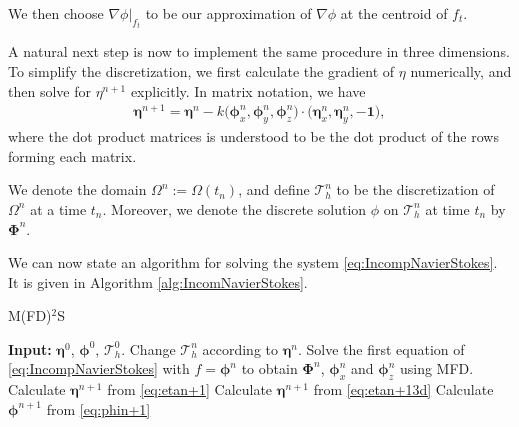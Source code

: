 \documentclass[11pt]{article}
\begin{document}
We then choose $\nabla \phi|_{f_t}$ to be our approximation of $\nabla \phi$ at the centroid of $f_t$.

A natural next step is now to implement the same procedure in three dimensions. To simplify the discretization, we first calculate
the gradient of $\eta$ numerically, and then solve for $\eta^{n+1}$ explicitly. In matrix notation, we have
\begin{align}
    \label{eq:etan+13d}
    \bm{\eta}^{n+1} = \bm{\eta}^n - k \big(\bm{\phi}_x^n, \bm{\phi}_y^n, \bm{\phi}_z^n\big)\cdot(\bm{\eta}_x^n, \bm{\eta}_y^n, -\bm{1}\big),
\end{align}
where the dot product matrices is understood to be the dot product of the rows forming each matrix.

We denote the domain $\Omega^n := \Omega(t_n)$, and define $\mathcal{T}_h^n$ to be the discretization of $\Omega^n$
at a time $t_n$. Moreover, we denote the discrete solution $\phi$ on $\mathcal{T}_h^n$ at time $t_n$ by $\bm{\Phi}^n$.

We can now state an algorithm for solving the system \eqref{eq:IncompNavierStokes}. It is given in Algorithm \ref{alg:IncomNavierStokes}.
%
%
\begin{algorithm}
    \caption{M(FD)$^2$S}
    \begin{algorithmic}[1]
    \State    \textbf{Input:} $\bm{\eta}^0$, $\bm{\phi}^0$, $\mathcal{T}_h^0$.
	    \State    Change $\mathcal{T}_h^n$ according to $\bm{\eta}^n$.
            \State    Solve the first equation of \eqref{eq:IncompNavierStokes} with $f = \bm{\phi}^n$ to obtain
                      $\bm{\Phi}^{n}$, $\bm{\phi}_x^n$ and $\bm{\phi}_z^n$ using MFD.
                \State    Calculate $\bm{\eta}^{n+1}$ from \eqref{eq:etan+1}
			    \State    Calculate $\bm{\eta}^{n+1}$ from \eqref{eq:etan+13d}
			\EndIf
        \State    Calculate $\bm{\phi}^{n+1}$ from \eqref{eq:phin+1}
        \EndFor
	\end{algorithmic}
	\label{alg:IncomNavierStokes}
\end{algorithm}
%
%
\end{document}

